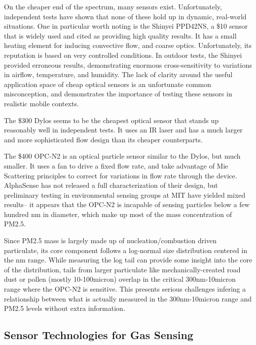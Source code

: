 On the cheaper end of the spectrum, many sensors exist.  Unfortunately, independent tests have shown that none of these hold up in dynamic, real-world situations. One in particular worth noting is the Shinyei PPD42NS, a \$10 sensor that is widely used and cited as providing high quality results. It has a small heating element for inducing convective flow, and coarse optics.  Unfortunately, its reputation is based on very controlled conditions.  In outdoor tests, the Shinyei provided erroneous results, demonstrating enormous cross-sensitivity to variations in airflow, temperature, and humidity. The lack of clarity around the useful application space of cheap optical sensors is an unfortunate common misconception, and demonstrates the importance of testing these sensors in realistic mobile contexts.

The \$300 Dylos seems to be the cheapest optical sensor that stands up reasonably well in independent tests. It uses an IR laser and has a much larger and more sophisticated flow design than its cheaper counterparts.

The \$400 OPC-N2 is an optical particle sensor similar to the Dylos, but much smaller.  It uses a fan to drive a fixed flow rate, and take advantage of Mie Scattering principles to correct for variations in flow rate through the device.  AlphaSense has not released a full characterization of their design, but preliminary testing in environmental sensing groups at MIT have yielded mixed results-- it appears that the OPC-N2 is incapable of sensing particles below a few hundred nm in diameter, which make up most of the mass concentration of PM2.5.  

Since PM2.5 mass is largely made up of nucleation/combustion driven particulate, its core component follows a log-normal size distribution centered in the nm range.  While measuring the log tail can provide some insight into the core of the distribution, tails from larger particulate like mechanically-created road dust or pollen (mostly 10-100micron) overlap in the critical 300nm-10micron range where the OPC-N2 is sensitive.  This presents serious challenges infering a relationship between what is actually measured in the 300nm-10micron range and PM2.5 levels without extra information.  

\subsection{Sensor Technologies for Gas Sensing}

